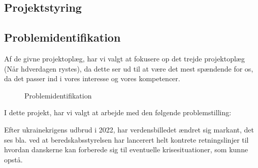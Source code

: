 \subsection{Projektstyring}


\subsection{Problemidentifikation}
Af de givne projektoplæg, har vi valgt at fokusere op det trejde projektoplæg (Når hdverdagen rystes), da dette ser ud til at være det mest spændende for os, da det passer ind i vores interesse og vores kompetencer.





\begin{figure}[h]
    \centering
    \caption{Problemidentifikation}
\end{figure}


I dette projekt, har vi valgt at arbejde med den følgende problemstilling:

Efter ukrainekrigens udbrud i 2022, har verdensbilledet ændret sig markant, det ses bla. ved at beredskabsstyrelsen har lancerert helt kontrete retningslinjer til hvordan danskerne kan forberede sig til eventuelle krisesituationer, som kunne opstå.